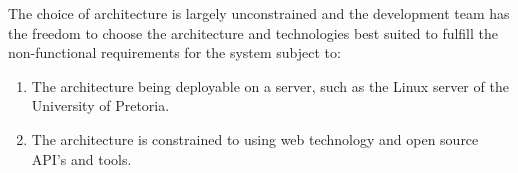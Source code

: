 \begin{flushleft}The choice of architecture is largely unconstrained and the development team has the freedom to
choose the architecture and technologies best suited to fulfill the non-functional requirements for
the system subject to:
\end{flushleft}
\begin{enumerate}
\item The architecture being deployable on a server, such as the Linux server of the University of Pretoria.
\item The architecture is constrained to using web technology and open source API's and tools.
\end{enumerate}